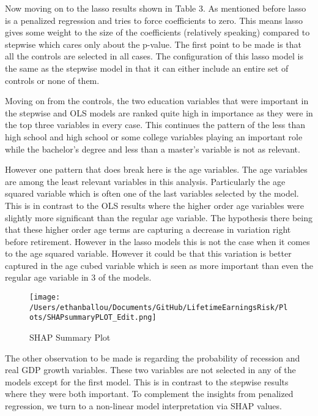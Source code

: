 \documentclass[12pt]{article}
\begin{document}
\begin{onehalfspace}



Now moving on to the lasso results shown in Table 3. As mentioned before lasso is a penalized regression and tries to force coefficients to zero. This means lasso gives some weight to the size of the coefficients (relatively speaking) compared to stepwise which cares only about the p-value. The first point to be made is that all the controls are selected in all cases. The configuration of this lasso model is the same as the stepwise model in that it can either include an entire set of controls or none of them. 

Moving on from the controls, the two education variables that were important in the stepwise and OLS models are ranked quite high in importance as they were in the top three variables in every case. This continues the pattern of the less than high school and high school or some college variables playing an important role while the bachelor's degree and less than a master's variable is not as relevant. 

However one pattern that does break here is the age variables. The age variables are among the least relevant variables in this analysis. Particularly the age squared variable which is often one of the last variables selected by the model. This is in contrast to the OLS results where the higher order age variables were slightly more significant than the regular age variable. The hypothesis there being that these higher order age terms are capturing a decrease in variation right before retirement. However in the lasso models this is not the case when it comes to the age squared variable. However it could be that this variation is better captured in the age cubed variable which is seen as more important than even the regular age variable in 3 of the models.







\begin{figure}[H]
    \centering
    \texttt{[image: /Users/ethanballou/Documents/GitHub/LifetimeEarningsRisk/Plots/SHAPsummaryPLOT\_Edit.png]}
    \caption{SHAP Summary Plot}
\end{figure}

\vspace{1cm}

The other observation to be made is regarding the probability of recession and real GDP growth variables. These two variables are not selected in any of the models except for the first model. This is in contrast to the stepwise results where they were both important. To complement the insights from penalized regression, we turn to a non-linear model interpretation via SHAP values.




\end{onehalfspace}
\end{document}
